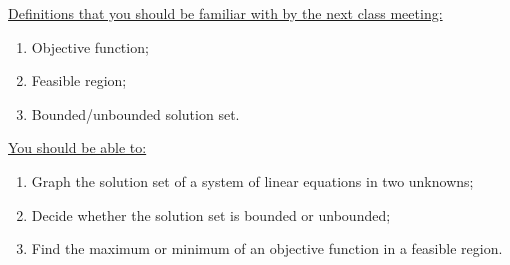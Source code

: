 \documentclass[12pt,dvipsnames]{article}
\begin{document}
 \begin{mdframed}[style=exampledefault,frametitle={Looking Ahead to Next Week...}]
 	{\underline{Definitions that you should be familiar with by the next class meeting:} }
 	\begin{enumerate}[label= {  \arabic*:},labelindent=2em, style = standard,leftmargin=4pc, labelsep=*, noitemsep]
 		\item Objective function;
 		\item Feasible region;
 		\item Bounded/unbounded solution set.
 	\end{enumerate}
 	{\underline{You should be able to:} }
 	\begin{enumerate}[label= {  \arabic*:},labelindent=2em, style = standard,leftmargin=4pc, labelsep=*, noitemsep]
 		\item Graph the solution set of a system of linear equations in two unknowns;
 		\item Decide whether the solution set is bounded or unbounded;
 		\item Find the maximum or minimum of an objective function in a feasible region.
 	\end{enumerate}
 	\end{mdframed}
\end{document}
